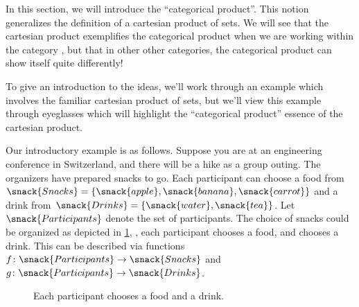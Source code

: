 

%


In this section, we will introduce the ``categorical product''.
This notion generalizes the definition of a cartesian product of sets.
We will see that the cartesian product exemplifies the categorical product when we are working within the category \Set, but that in other other categories, the categorical product can show itself quite differently!

To give an introduction to the ideas, we'll work through an example which involves the familiar cartesian product of sets, but we'll view this example through eyeglasses which will highlight the ``categorical product'' essence of the cartesian product.

Our introductory example is as follows.
Suppose you are at an engineering conference in Switzerland, and there will be a hike as a group outing.
The organizers have prepared snacks to go.
Each participant can choose a food from~$\snack{Snacks}=\{\snack{apple},\snack{banana},\snack{carrot}\}$ and a drink from~$\snack{Drinks}=\{\snack{water},\snack{tea}\}$.
Let~$\snack{Participants}$ denote the set of participants.
The choice of snacks could be organized as depicted in \cref{fig:snacks_1}, \ie , each participant chooses a food, and chooses a drink.
This can be described via functions~$f\colon \snack{Participants} \to \snack{Snacks}$ and~$g\colon  \snack{Participants} \to \snack{Drinks}$.

\begin{figure}[h!]
  \begin{center}
  \end{center}
  \caption{Each participant chooses a food and a drink.}
  \label{fig:snacks_1}
\end{figure}

